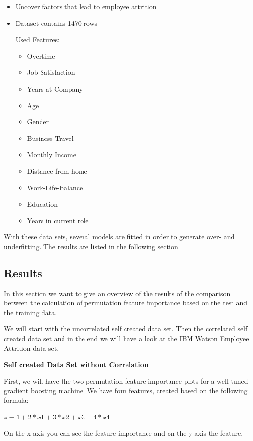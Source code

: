 \documentclass[]{krantz}
\providecommand{\tightlist}{%
  \setlength{\itemsep}{0pt}\setlength{\parskip}{0pt}}
\begin{document}
\begin{itemize}
\item
  Uncover factors that lead to employee attrition
\item
  Dataset contains 1470 rows

  Used Features:

  \begin{itemize}
  \tightlist
  \item
    Overtime
  \item
    Job Satisfaction
  \item
    Years at Company
  \item
    Age
  \item
    Gender
  \item
    Business Travel
  \item
    Monthly Income
  \item
    Distance from home
  \item
    Work-Life-Balance
  \item
    Education
  \item
    Years in current role
  \end{itemize}
\end{itemize}

With these data sets, several models are fitted in order to generate
over- and underfitting. The results are listed in the following section

\subsection{Results}\label{results}

In this section we want to give an overview of the results of the
comparison between the calculation of permutation feature importance
based on the test and the training data.

We will start with the uncorrelated self created data set. Then the
correlated self created data set and in the end we will have a look at
the IBM Watson Employee Attrition data set.

\textbf{Self created Data Set without Correlation}

First, we will have the two permutation feature importance plots for a
well tuned gradient boosting machine. We have four features, created
based on the following formula:

\(z = 1 + 2*x1 + 3*x2 + x3 + 4*x4\)

On the x-axis you can see the feature importance and on the y-axis the
feature.
\end{document}
